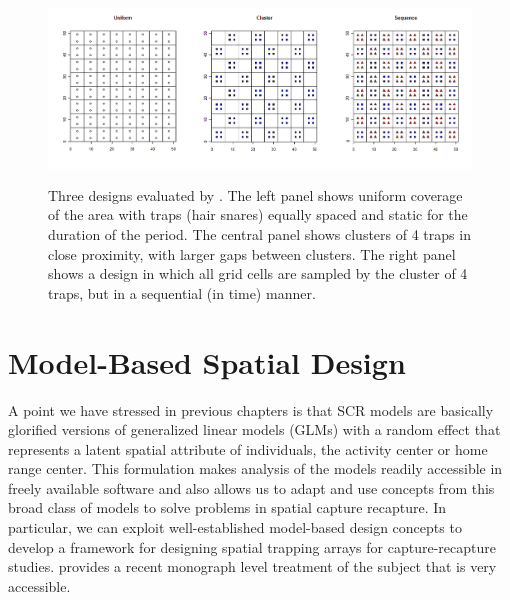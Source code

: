 \begin{figure}[ht]
\centering
\includegraphics[width=5in,height=1.94in]{Ch10-Design/figs/catsun_designs.png}
\caption{Three designs evaluated by \citet{sun:2013}. The left panel
  shows uniform coverage of the area with traps (hair snares) equally
  spaced and static for the duration of the period. The central panel
  shows clusters of 4 traps in close proximity, with larger gaps
  between clusters. The right panel shows a design in which all grid
  cells are sampled by the cluster of 4 traps, but in a sequential (in
  time) manner.}
\label{design.fig.sun}
\end{figure}




\section{Model-Based Spatial Design}

A point we have stressed in previous chapters is that SCR models are
basically glorified versions of generalized linear models (GLMs) with
a random effect that represents a latent spatial attribute of
individuals, the activity center or home
range center.  This formulation makes analysis of the models readily
accessible in freely available software and also allows us to adapt
and use concepts from this broad class of models to solve problems in
spatial capture recapture. In particular, we can exploit
well-established model-based design concepts
\citep{kiefer:1959,
box_draper:1959,
box_draper:1987,
fedorov:1972,
sacks_etal:1989,
hardin_sloane:1993,
fedorov_hackl:1997}
to develop a framework for designing
spatial trapping arrays for capture-recapture studies.
\citet{muller:2007} provides a recent monograph level treatment of the subject
that is very accessible.

